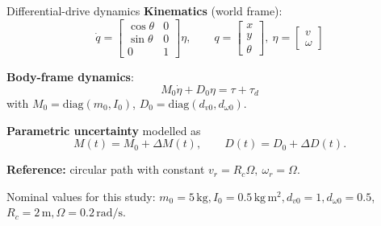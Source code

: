 \documentclass[10pt,aspectratio=169]{beamer}
\begin{document}
\begin{frame}{Differential-drive dynamics}
  \textbf{Kinematics} (world frame):
  \begin{equation*}
    \dot q=\begin{bmatrix}\cos\theta & 0\\ \sin\theta & 0\\ 0 & 1\end{bmatrix}\eta,
    \qquad q=\begin{bmatrix}x\\y\\\theta\end{bmatrix},\ \eta=\begin{bmatrix}v\\\omega\end{bmatrix}
  \end{equation*}

  \textbf{Body-frame dynamics}:
  \begin{equation*}
    M_0\dot\eta+D_0\eta=\tau+\tau_d
  \end{equation*}
  with $M_0=\mathrm{diag}(m_0,I_0)$, $D_0=\mathrm{diag}(d_{v0},d_{\omega 0})$.

  \vspace{0.5em}
  \textbf{Parametric uncertainty} modelled as
  \begin{equation*}
    M(t)=M_0+\Delta M(t),\qquad D(t)=D_0+\Delta D(t).
  \end{equation*}

  \vspace{0.4em}
  \textbf{Reference:} circular path with constant
  $v_r=R_c\Omega,\ \omega_r=\Omega$.

  \vspace{0.4em}
  Nominal values for this study:
  $m_0\!=\!5\,\mathrm{kg}, I_0\!=\!0.5\,\mathrm{kg\,m^2}, d_{v0}\!=\!1, d_{\omega 0}\!=\!0.5$,
  $R_c\!=\!2\,\mathrm{m}, \Omega\!=\!0.2\,\mathrm{rad/s}$.
\end{frame}
\end{document}
